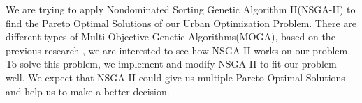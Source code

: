\iffalse
In your thesis document, you should have a good abstract that can answer the following questions: (1) What is the problem you worked on, (2) Why is it interesting or motivation for working on this problem, (3) How did you achieve the solution or What did you do?, and (4) How well did your idea work out?
\fi

We are trying to apply Nondominated Sorting Genetic Algorithm II(NSGA-II) to find the Pareto Optimal Solutions of our Urban Optimization Problem. There are different types of Multi-Objective Genetic Algorithms(MOGA), based on the previous research \cite{Magnier_2010_Multiobjective}, we are interested to see how NSGA-II works on our problem. To solve this problem, we implement and modify NSGA-II to fit our problem well. We expect that NSGA-II could give us multiple Pareto Optimal Solutions and help us to make a better decision.
